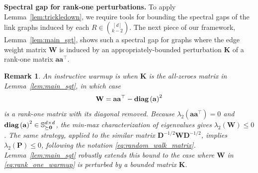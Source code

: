 \documentclass[11pt]{article}
\newtheorem{remark}{Remark}
\newcommand{\lam}{\lambda}
\newcommand{\diag}[1]{\textbf{\textup{diag}}\left(#1\right)}
\newcommand{\1}{\mathbf{1}}
\newcommand{\0}{\mathbf{0}}
\newcommand{\mzero}{\mathbf{0}}
\newcommand{\Sym}{\mathbb{S}}
\newcommand{\PSD}{\Sym_{\succeq \mzero}}
\newcommand{\md}{{\mathbf{D}}}
\newcommand{\mk}{{\mathbf{K}}}
\newcommand{\mpp}{{\mathbf{P}}}
\newcommand{\mw}{{\mathbf{W}}}
\newcommand{\va}{{\mathbf{a}}}
\begin{document}
\textbf{Spectral gap for rank-one perturbations.} To apply Lemma~\ref{lem:trickledown}, we require tools for bounding the spectral gaps of the link graphs induced by each $R \in \binom{[d]}{k-2}$. The next piece of our framework, Lemma~\ref{lem:main_sgt}, shows such a spectral gap for graphs where the edge weight matrix $\mw$ is induced by an appropriately-bounded perturbation $\mk$ of a rank-one matrix $\va\va^\top$.

\begin{remark}\label{rem:no_k}
An instructive warmup is when $\mk$ is the all-zeroes matrix in Lemma~\ref{lem:main_sgt}, in which case
\begin{equation}\label{eq:rank_one_warmup}\mw = \va\va^\top - \diag{\va}^2\end{equation}
is a rank-one matrix with its diagonal removed. Because $\lam_2(\va\va^\top) = 0$ and $\diag{\va}^2 \in \PSD^{d \times d}$, the min-max characterization of eigenvalues gives $\lam_2(\mw) \le 0$. The same strategy, applied to the similar matrix $\md^{-1/2} \mw \md^{-1/2}$, implies $\lam_2(\mpp) \le 0$, following the notation \eqref{eq:random_walk_matrix}. Lemma~\ref{lem:main_sgt} robustly extends this bound to the case where $\mw$ in \eqref{eq:rank_one_warmup} is perturbed by a bounded matrix $\mk$.
\end{remark}
\end{document}
